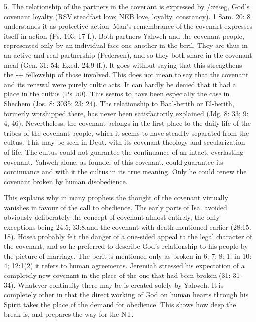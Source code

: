 				5. The relationship of the partners in the covenant is expressed by /:zeseg, God's covenant loyalty (RSV steadfast love; NEB love, loyalty, constancy). 1 Sam. 20: 8 understands it as protective action. Man's remembrance of the covenant expresses itself in action (Ps. 103: 17 f.). Both partners Yahweh and the covenant people, represented only by an individual face one another in the beril. They are thus in an active and real partnership (Pedersen), and so they both share in the covenant meal (Gen. 31: 54; Exod. 24:9 ff.). It goes without saying that this strengthens the -+ fellowship of those involved. This does not mean to say that the covenant and its renewal were purely cultic acts. It can hardly be denied that it had a place in the cultus (Ps. 50). This seems to have been especially the case in Shechem (Jos. 8: 3035; 23: 24). The relationship to Baal-berith or El-berith, formerly worshipped there, has never been satisfactorily explained (Jdg. 8: 33; 9: 4, 46). Nevertheless, the covenant belongs in the first place to the daily life of the tribes of the covenant people, which it seems to have steadily separated from the cultus. This may be seen in Deut. with its covenant theology and secularization of life. The cultus could not guarantee the continuance of an intact, everlasting covenant. Yahweh alone, as founder of this covenant, could guarantee its continuance and with it the cultus in its true meaning. Only he could renew the covenant broken by human disobedience. 

				This explains why in many prophets the thought of the covenant virtually vanishes in favour of the call to obedience. The early parts of Isa. avoided obviously deliberately the concept of covenant almost entirely, the only exceptions being 24:5; 33:8.and the covenant with death mentioned earlier (28:15, 18). Hosea probably felt the danger of a one-sided appeal to the legal character of the covenant, and so he preferred to describe God's relationship to his people by the picture of marriage. The berit is mentioned only as broken in 6: 7; 8: 1; in 10: 4; 12:1(2) it refers to human agreements. Jeremiah stressed his expectation of a completely new covenant in the place of the one that had been broken (31: 31-34). Whatever continuity there may be is created solely by Yahweh. It is completely other in that the direct working of God on human hearts through his Spirit takes the place of the demand for obedience. This shows how deep the break is, and prepares the way for the NT. 

